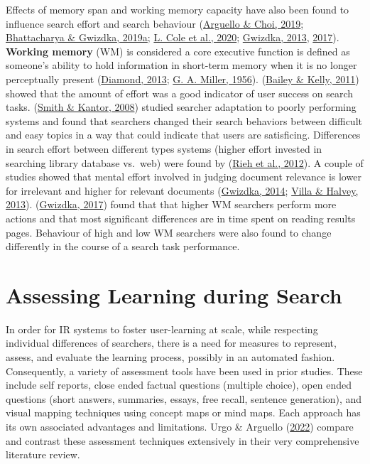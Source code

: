 \documentclass[letterpaper, nobind]{templates/ociamthesis}
\begin{document}
Effects of memory span and working memory capacity have also been found
to influence search effort and search behaviour
(\protect\hyperlink{ref-arguello2019effects}{Arguello \& Choi, 2019}; \protect\hyperlink{ref-CHIIR19}{Bhattacharya \& Gwizdka, 2019a}; \protect\hyperlink{ref-cole2020more}{L. Cole et al., 2020}; \protect\hyperlink{ref-gwizdka2013effects}{Gwizdka, 2013}, \protect\hyperlink{ref-gwizdka2017can}{2017}).
\textbf{Working memory} (WM) is considered a core executive function is
defined as someone's ability to hold information in short-term memory
when it is no longer perceptually present
(\protect\hyperlink{ref-diamond2013executive}{Diamond, 2013}; \protect\hyperlink{ref-miller1956magical}{G. A. Miller, 1956}). (\protect\hyperlink{ref-bailey2011amount}{Bailey \& Kelly, 2011}) showed
that the amount of effort was a good indicator of user success on search
tasks. (\protect\hyperlink{ref-smith2008user}{Smith \& Kantor, 2008}) studied searcher adaptation to poorly performing
systems and found that searchers changed their search behaviors between
difficult and easy topics in a way that could indicate that users are
satisficing. Differences in search effort between different types
systems (higher effort invested in searching library database vs.~web)
were found by (\protect\hyperlink{ref-rieh2012amount}{Rieh et al., 2012}). A couple of studies showed that mental
effort involved in judging document relevance is lower for irrelevant
and higher for relevant documents (\protect\hyperlink{ref-37}{Gwizdka, 2014}; \protect\hyperlink{ref-villa2013relevance}{Villa \& Halvey, 2013}).
(\protect\hyperlink{ref-gwizdka2017can}{Gwizdka, 2017}) found that that higher WM searchers perform more
actions and that most significant differences are in time spent on
reading results pages. Behaviour of high and low WM searchers were also
found to change differently in the course of a search task performance.

\hypertarget{assessing-learning-during-search}{%
\section{Assessing Learning during Search}\label{assessing-learning-during-search}}

In order for IR systems to foster user-learning at scale, while
respecting individual differences of searchers, there is a need for
measures to represent, assess, and evaluate the learning process,
possibly in an automated fashion. Consequently, a variety of assessment
tools have been used in prior studies. These include self reports, close
ended factual questions (multiple choice), open ended questions (short
answers, summaries, essays, free recall, sentence generation), and
visual mapping techniques using concept maps or mind maps. Each approach
has its own associated advantages and limitations.
Urgo \& Arguello (\protect\hyperlink{ref-urgo2022learning}{2022}) compare and contrast these assessment techniques extensively in their very comprehensive literature review.
\end{document}
